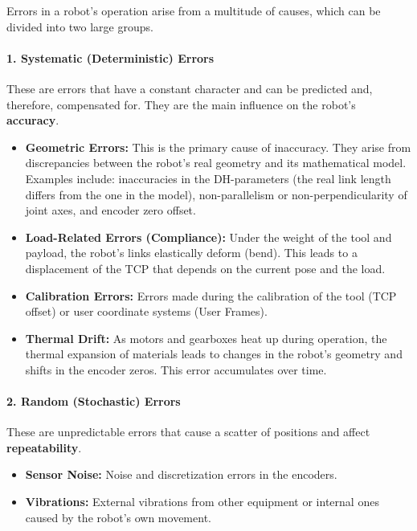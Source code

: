 Errors in a robot's operation arise from a multitude of causes, which can be divided into two large groups.

\paragraph{1. Systematic (Deterministic) Errors}
These are errors that have a constant character and can be predicted and, therefore, compensated for. They are the main influence on the robot's \textbf{accuracy}.
\begin{itemize}
    \item \textbf{Geometric Errors:} This is the primary cause of inaccuracy. They arise from discrepancies between the robot's real geometry and its mathematical model. Examples include: inaccuracies in the DH-parameters (the real link length differs from the one in the model), non-parallelism or non-perpendicularity of joint axes, and encoder zero offset.
    \item \textbf{Load-Related Errors (Compliance):} Under the weight of the tool and payload, the robot's links elastically deform (bend). %
    This leads to a displacement of the TCP that depends on the current pose and the load.
    \item \textbf{Calibration Errors:} Errors made during the calibration of the tool (TCP offset) or user coordinate systems (User Frames).
    \item \textbf{Thermal Drift:} As motors and gearboxes heat up during operation, the thermal expansion of materials leads to changes in the robot's geometry and shifts in the encoder zeros. This error accumulates over time.
\end{itemize}

\paragraph{2. Random (Stochastic) Errors}
These are unpredictable errors that cause a scatter of positions and affect \textbf{repeatability}.
\begin{itemize}
    \item \textbf{Sensor Noise:} Noise and discretization errors in the encoders.
    \item \textbf{Vibrations:} External vibrations from other equipment or internal ones caused by the robot's own movement.
\end{itemize}


